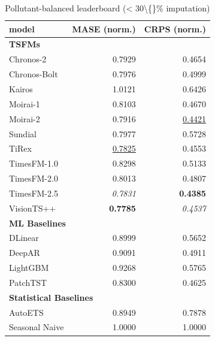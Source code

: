 \begin{table}[H]
\caption{Pollutant-balanced leaderboard (\textless{} 30\textbackslash\{\}\% imputation)}
\centering
\begin{small}
\begin{tabular}{lrr}
\toprule
model & MASE (norm.) & CRPS (norm.) \\
\midrule
\multicolumn{3}{l}{\textbf{TSFMs}} \\
Chronos-2 & 0.7929 & 0.4654 \\
Chronos-Bolt & 0.7976 & 0.4999 \\
Kairos & 1.0121 & 0.6426 \\
Moirai-1 & 0.8103 & 0.4670 \\
Moirai-2 & 0.7916 & \underline{0.4421} \\
Sundial & 0.7977 & 0.5728 \\
TiRex & \underline{0.7825} & 0.4553 \\
TimesFM-1.0 & 0.8298 & 0.5133 \\
TimesFM-2.0 & 0.8013 & 0.4807 \\
TimesFM-2.5 & \textit{0.7831} & \textbf{0.4385} \\
VisionTS++ & \textbf{0.7785} & \textit{0.4537} \\
\midrule
\multicolumn{3}{l}{\textbf{ML Baselines}} \\
DLinear & 0.8999 & 0.5652 \\
DeepAR & 0.9091 & 0.4911 \\
LightGBM & 0.9268 & 0.5765 \\
PatchTST & 0.8300 & 0.4625 \\
\midrule
\multicolumn{3}{l}{\textbf{Statistical Baselines}} \\
AutoETS & 0.8949 & 0.7878 \\
Seasonal Naive & 1.0000 & 1.0000 \\
\bottomrule
\end{tabular}
\end{small}
\end{table}